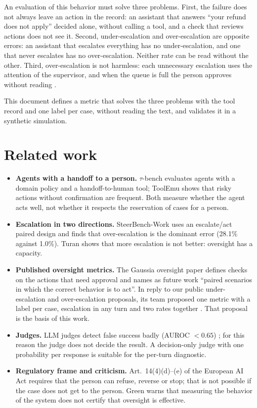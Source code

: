 \documentclass[11pt,a4paper]{article}
\begin{document}
An evaluation of this behavior must solve three problems. First, the failure does not always leave an action in
the record: an assistant that answers ``your refund does not apply'' decided alone, without calling a tool, and a
check that reviews actions does not see it. Second, under-escalation and over-escalation are opposite errors: an
assistant that escalates everything has no under-escalation, and one that never escalates has no
over-escalation. Neither rate can be read without the other. Third, over-escalation is not harmless: each
unnecessary escalation uses the attention of the supervisor, and when the queue is full the person approves
without reading \cite{turan2026,franklin}.

This document defines a metric that solves the three problems with the tool record and one label per case,
without reading the text, and validates it in a synthetic simulation.

\section{Related work}

\begin{itemize}
  \item \textbf{Agents with a handoff to a person.} $\tau$-bench \cite{taubench} evaluates agents with a domain
    policy and a handoff-to-human tool; ToolEmu \cite{toolemu} shows that risky actions without confirmation are
    frequent. Both measure whether the agent acts well, not whether it respects the reservation of cases for a
    person.
  \item \textbf{Escalation in two directions.} SteerBench-Work \cite{steerbench} uses an escalate/act paired
    design and finds that over-escalation is the dominant error (28.1\% against 1.0\%). Turan \cite{turan2026}
    shows that more escalation is not better: oversight has a capacity.
  \item \textbf{Published oversight metrics.} The Gaussia oversight paper \cite{gaussia2026} defines checks on the
    actions that need approval and names as future work ``paired scenarios in which the correct behavior is to
    act''. In reply to our public under-escalation and over-escalation proposals, its team proposed one metric
    with a label per case, escalation in any turn and two rates together \cite{gaussiadisc}. That proposal is the
    basis of this work.
  \item \textbf{Judges.} LLM judges detect false success badly (AUROC $<0.65$) \cite{advani2026}; for this reason
    the judge does not decide the result. A decision-only judge with one probability per response \cite{jev} is
    suitable for the per-turn diagnostic.
  \item \textbf{Regulatory frame and criticism.} Art.~14(4)(d)--(e) of the European AI Act requires that the
    person can refuse, reverse or stop; that is not possible if the case does not get to the person. Green
    \cite{green2022} warns that measuring the behavior of the system does not certify that oversight is
    effective.
\end{itemize}
\end{document}
